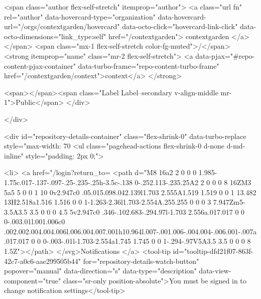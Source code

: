     <span class="author flex-self-stretch" itemprop="author">
      <a class="url fn" rel="author" data-hovercard-type="organization" data-hovercard-url="/orgs/contextgarden/hovercard" data-octo-click="hovercard-link-click" data-octo-dimensions="link_type:self" href="/contextgarden">
        contextgarden
</a>    </span>
    <span class="mx-1 flex-self-stretch color-fg-muted">/</span>
    <strong itemprop="name" class="mr-2 flex-self-stretch">
      <a data-pjax="#repo-content-pjax-container" data-turbo-frame="repo-content-turbo-frame" href="/contextgarden/context">context</a>
    </strong>

    <span></span><span class="Label Label--secondary v-align-middle mr-1">Public</span>
  </div>


        </div>

        <div id="repository-details-container" class="flex-shrink-0" data-turbo-replace style="max-width: 70%
            <ul class="pagehead-actions flex-shrink-0 d-none d-md-inline" style="padding: 2px 0;">
    
      

  <li>
            <a href="/login?return_to=%
    <path d="M8 16a2 2 0 0 0 1.985-1.75c.017-.137-.097-.25-.235-.25h-3.5c-.138 0-.252.113-.235.25A2 2 0 0 0 8 16ZM3 5a5 5 0 0 1 10 0v2.947c0 .05.015.098.042.139l1.703 2.555A1.519 1.519 0 0 1 13.482 13H2.518a1.516 1.516 0 0 1-1.263-2.36l1.703-2.554A.255.255 0 0 0 3 7.947Zm5-3.5A3.5 3.5 0 0 0 4.5 5v2.947c0 .346-.102.683-.294.97l-1.703 2.556a.017.017 0 0 0-.003.01l.001.006c0 .002.002.004.004.006l.006.004.007.001h10.964l.007-.001.006-.004.004-.006.001-.007a.017.017 0 0 0-.003-.01l-1.703-2.554a1.745 1.745 0 0 1-.294-.97V5A3.5 3.5 0 0 0 8 1.5Z"></path>
</svg>Notifications
</a>    <tool-tip id="tooltip-dfd21f07-863f-42c7-a0c6-aae299505b44" for="repository-details-watch-button" popover="manual" data-direction="s" data-type="description" data-view-component="true" class="sr-only position-absolute">You must be signed in to change notification settings</tool-tip>

